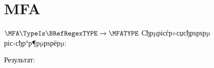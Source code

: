 \section{MFA}
\begin{frame}{$\MFA\TypeIs\BRefRegexTYPE\to\MFATYPE$}
	Сђрµрісѓр»сџсђрѕрѕрµ ріс‹сђр°р¶рµрѕрёрµ:

	Результат:
\end{frame}